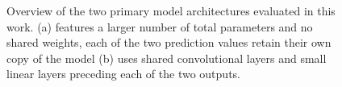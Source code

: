 \documentclass{article}
\begin{document}
\begin{figure}
\centering
    \caption{Overview of the two primary model architectures evaluated in this work. (a) features a larger number of total parameters and no shared weights, each of the two prediction values retain their own copy of the model (b) uses shared convolutional layers and small linear layers preceding each of the two outputs.}
\label{fig:model_arch}
\end{figure}
\end{document}
